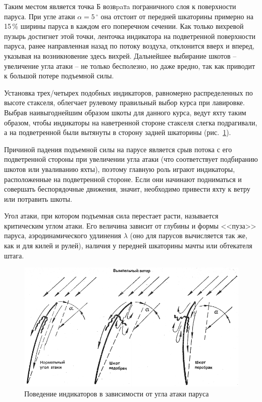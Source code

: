 \documentclass[a4paper, 12pt, twoside, final, book, russian, fittopage, cyremdash]{ncc}
\newcommand{\gr}{\ensuremath{\,^\circ}\xspace}
\newcommand{\ris}[1]{\ref{fig:#1}}
\begin{document}
Таким местом является точка Б возвpaтa пограничного слоя к поверхности паруса. При угле атаки $\alpha = 5\gr$ она отстоит от передней шкаторины примерно на 15\,\% ширины паруса в каждом его поперечном сечении. Как только вихревой пузырь достигнет этой точки, ленточка индикатора на подветренной поверхности паруса, ранее направленная назад по потоку воздуха, отклонится вверх и вперед, указывая на возникновение здесь вихрей. Дальнейшее выбирание шкотов \--- увеличение угла атаки \--- не только бесполезно, но даже вредно, так как приводит к большой потере подъемной силы.

Установка трех\-/четырех подобных индикаторов, равномерно распределенных по высоте стакселя, облегчает рулевому правильный выбор курса при лавировке. Выбрав наивыгоднейшим образом шкоты для данного курса, ведут яхту таким образом, чтобы индикаторы на наветренной стороне стакселя слегка подрагивали, а на подветренной были вытянуты в сторону задней шкаторины (рис.~\ris{23}).
 
Причиной падения подъемной силы на парусе является срыв потока с его подветренной стороны при увеличении угла атаки (что соответствует подбиранию шкотов или уваливанию яхты), поэтому главную роль играют индикаторы, расположенные на подветренной стороне. Если они начинают подниматься и совершать беспорядочные движения, значит, необходимо привести яхту к ветру или потравить шкоты.

Угол атаки, при котором подъемная сила перестает расти, называется критическим углом атаки. Его величина зависит от глубины и формы <<пуза>> паруса, аэродинамического удлинения $\lambda$ (оно для парусов вычисляется так же, как и для килей и рулей), наличия у передней шкаторины мачты или обтекателя штага.

\begin{figure}[htb]
  \centering
  \includegraphics[scale=1.3]{0023P}
  \caption{Поведение индикаторов в зависимости от угла атаки паруса}
  \label{fig:23}
\end{figure}
\end{document}
